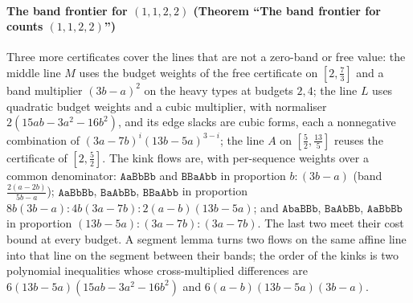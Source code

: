 \paragraph{The band frontier for $(1,1,2,2)$ (Theorem ``The band frontier for counts $(1,1,2,2)$'')}
Three more certificates cover the lines that are not a zero-band or free value: the middle line
$M$ uses the budget weights of the free certificate on $[2,\frac73]$ and a band multiplier $(3b-a)^2$
on the heavy types at budgets $2,4$; the line $L$ uses quadratic budget weights and a cubic
multiplier, with normaliser $2(15ab-3a^2-16b^2)$, and its edge slacks are cubic forms, each a
nonnegative combination of $(3a-7b)^i(13b-5a)^{3-i}$; the line $A$ on $[\frac52,\frac{13}5]$ reuses the
certificate of $[2,\frac52]$. The kink flows are, with per-sequence weights over a common
denominator: $\mathtt{AaBbBb}$ and $\mathtt{BBaAbb}$ in proportion $b:(3b-a)$ (band
$\frac{2(a-2b)}{5b-a}$); $\mathtt{AaBbBb}$, $\mathtt{BaAbBb}$, $\mathtt{BBaAbb}$ in proportion
$8b(3b-a):4b(3a-7b):2(a-b)(13b-5a)$; and $\mathtt{AbaBBb}$, $\mathtt{BaAbBb}$, $\mathtt{AaBbBb}$ in
proportion $(13b-5a):(3a-7b):(3a-7b)$. The last two meet their cost bound at every budget. A segment
lemma turns two flows on the same affine line into that line on the segment between their bands;
the order of the kinks is two polynomial inequalities whose cross-multiplied differences are
$6(13b-5a)(15ab-3a^2-16b^2)$ and $6(a-b)(13b-5a)(3b-a)$.

